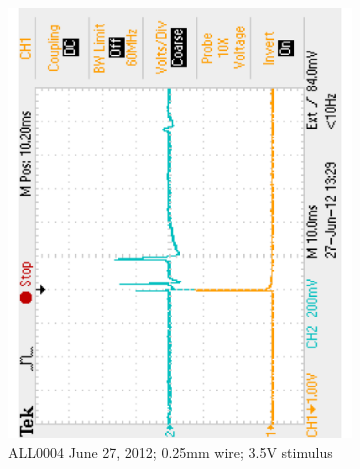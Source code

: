 \begin{figure}[H]
	\centering 
	\begin{singlespace}
	\begin{subfigure}[b]{0.48\textwidth}
		\centering 
		\includegraphics[trim=0 0.1in 0 0.1in,clip,angle=-90,width=\textwidth]{./figures/F0004TEK_30a_120627} %
	\caption{ALL0004 June 27, 2012; 0.25mm wire; 3.5V stimulus}
	\end{subfigure}
	~
	\begin{subfigure}[b]{0.48\textwidth}
		\centering 

\end{subfigure}
\end{singlespace}
\end{figure}
